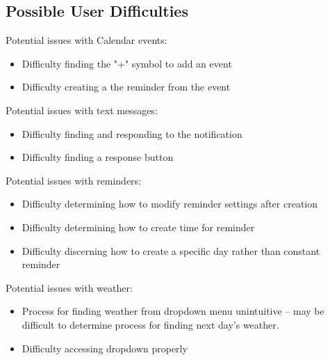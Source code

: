 \subsection{Possible User Difficulties}
Potential issues with Calendar events:
\begin{itemize}
\item Difficulty finding the "+" symbol to add an event
\item Difficulty creating a the reminder from the event
\end{itemize}
Potential issues with text messages:
\begin{itemize}
\item Difficulty finding and responding to the notification
\item Difficulty finding a response button
\end{itemize}
Potential issues with reminders:
\begin{itemize}
\item Difficulty determining how to modify reminder settings after creation
\item Difficulty determining how to create time for reminder
\item Difficulty discerning how to create a specific day rather than constant reminder
\end{itemize}
Potential issues with weather:
\begin{itemize}
\item Process for finding weather from dropdown menu unintuitive -- may be difficult to determine process for finding next day's weather.
\item Difficulty accessing dropdown properly
\end{itemize}

